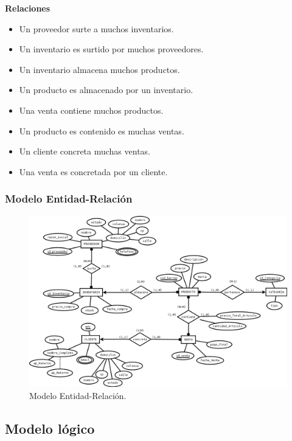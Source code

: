 \documentclass[12pt,letterpaper]{article}
\begin{document}
			\textbf{Relaciones}\par
			\begin{itemize}
				\item Un proveedor surte a muchos inventarios.
				\item Un inventario es surtido por muchos proveedores. \\
				\item Un inventario almacena muchos productos.
				\item Un producto es almacenado por un inventario.\\
				\item Una venta contiene muchos productos.
				\item Un producto es contenido es muchas ventas.\\
				\item Un cliente concreta muchas ventas.
				\item Una venta es concretada por un cliente.
				
			\end{itemize}
			\subsubsection{Modelo Entidad-Relación}
			\begin{figure}[H]
				\centering
				\includegraphics[width=\linewidth]{img/MER}
				\caption{Modelo Entidad-Relación.}
			\end{figure}
			
			
		\subsection{Modelo lógico}
\end{document}
